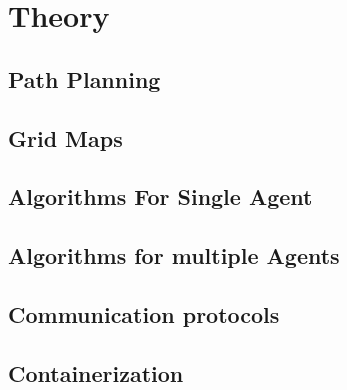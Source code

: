 \chapter{Theory}

\section{Path Planning}


\section{Grid Maps}


\section{Algorithms For Single Agent}


\section{Algorithms for multiple Agents}


\section{Communication protocols}


\section{Containerization}
